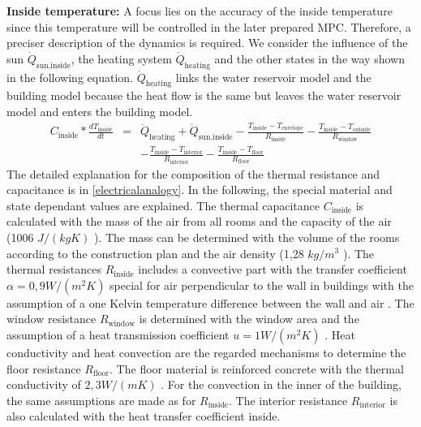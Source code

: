     \textbf{Inside temperature:}\newline
    A focus lies on the accuracy of the inside temperature since this temperature will be controlled in the later prepared MPC. Therefore, a preciser description of the dynamics is required. We consider the influence of the sun $\dot{Q}_\text{sun,inside}$, the heating system $\dot{Q}_\text{heating}$ and the other states in the way shown in the following equation. $\dot{Q}_\text{heating}$  links the water reservoir model and the building model because the heat flow is the same but leaves the water reservoir model and enters the building model. 
    \begin{align}
        \label{eq:1.state}
        C_\text{inside}*\frac{d T_\text{inside}}{d t} &=& \dot{Q}_\text{heating} + \dot{Q}_\text{sun,inside} - \frac{T_\text{inside}-T_\text{envelope}}{R_\text{inside}} - \frac{T_\text{inside}-T_\text{outside}}{R_\text{window}} \\
       & &-\frac{T_\text{inside}-T_\text{interior}}{R_\text{interior}}-\frac{T_\text{inside}-T_\text{floor}}{R_\text{floor}}\nonumber
    \end{align}
    The detailed explanation for the composition of the thermal resistance and capacitance is in \autoref{electricalanalogy}. In the following, the special material and state dependant values are explained.
    The thermal capacitance $C_\text{inside}$ is calculated with the mass of the air from all rooms and the capacity of the air (1006 $J/(kg K)$ \cite{Weigand.2016}). The mass can be determined with the volume of the rooms according to the construction plan \cite{Bauplan} and the air density (1,28 $kg/m^3$ \cite{Weigand.2016}). 
    The thermal resistances $R_\text{inside}$ includes a convective part with the transfer coefficient $\alpha = 0,9 W/(m^2 K)$ special for air perpendicular to the wall in buildings with the assumption of a one Kelvin temperature difference between the wall and air \cite{Schweizer-fnalpha}.
    The window resistance $R_\text{window}$ is determined with the window area and the assumption of a heat transmission coefficient $u = 1 W/(m^2 K)$ \cite{ThorbenFrahm.2021}. 
    Heat conductivity and heat convection are the regarded mechanisms to determine the floor resistance $R_\text{floor}$. The floor material is reinforced concrete with the thermal conductivity of $2,3 W/(m K)$ \cite{AntonSchweizer.12.10.2021}. For the convection in the inner of the building, the same assumptions are made as for $R_\text{inside}$. 
    The interior resistance $R_\text{interior}$ is also calculated with the heat transfer coefficient inside.\newline 
    
